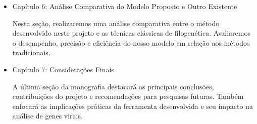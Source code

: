 \begin{itemize}
  \item Capítulo 6: Análise Comparativa do Modelo Proposto e Outro Existente

        Nesta seção, realizaremos uma análise comparativa entre o método desenvolvido neste projeto e as técnicas clássicas de filogenética. Avaliaremos o desempenho, precisão e eficiência do nosso modelo em relação aos métodos tradicionais.

  \item Capítulo 7: Considerações Finais

        A última seção da monografia destacará as principais conclusões, contribuições do projeto e recomendações para pesquisas futuras. Também enfocará as implicações práticas da ferramenta desenvolvida e seu impacto na análise de genes virais.
\end{itemize}

